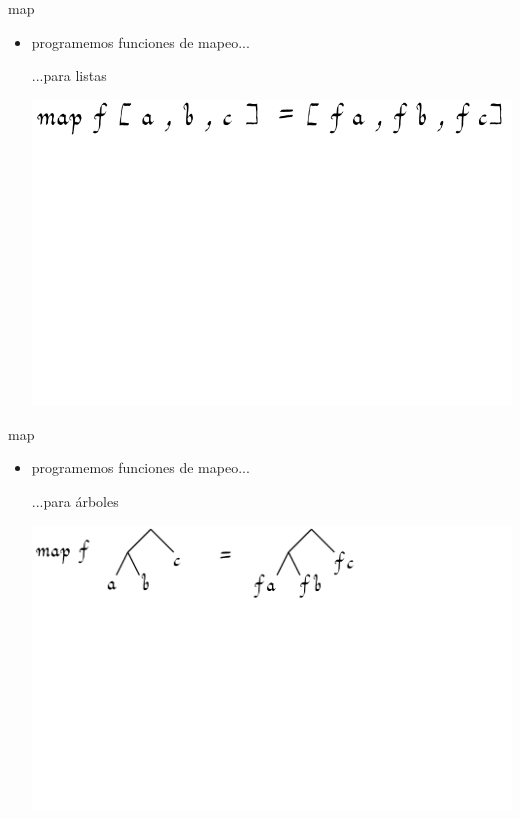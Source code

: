 \documentclass[9pt]{beamer}
\begin{document}
\begin{frame}{map}
  \begin{itemize}
  \item programemos funciones de mapeo...
    \begin{block}{...para listas}\end{block}
    \pause \vspace{1cm}
    \begin{center}\hspace{-2cm}\includegraphics[scale=0.5]{img/maplist}\end{center}
  \end{itemize}
\end{frame}

\begin{frame}{map}
  \begin{itemize}
  \item programemos funciones de mapeo...
    \begin{block}{...para árboles}\end{block}
    \pause \vspace{1cm}
    \begin{center}\includegraphics[scale=0.5]{img/maptree}\end{center}
  \end{itemize}
\end{frame}
\end{document}
